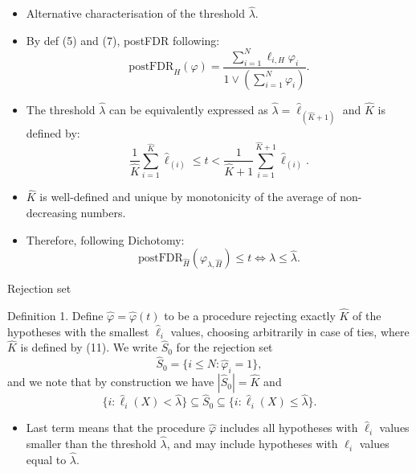 \documentclass[10pt, aspectratio=169]{beamer}
\begin{document}
\begin{frame}
    \begin{itemize}[label=\scalebox{0.5}{$\bullet$}]
        \item Alternative characterisation of the threshold \( \hat{\lambda} \).
        \item By def (5) and (7), postFDR following: 
        \begin{equation}
            \text{postFDR}_H(\varphi) = \frac{\sum_{i=1}^{N} \ell_{i,H} \varphi_i}{1 \lor (\sum_{i=1}^{N} \varphi_i)}. \tag{10}
        \end{equation}
        \item The threshold \( \hat{\lambda} \) can be equivalently expressed as \( \hat{\lambda} = \hat{\ell}_{(\hat{K}+1)} \) and \( \hat{K} \) is defined by:
        \begin{equation}
            \frac{1}{\hat{K}} \sum_{i=1}^{\hat{K}} \hat{\ell}_{(i)} \leq t < \frac{1}{\hat{K}+1} \sum_{i=1}^{\hat{K}+1} \hat{\ell}_{(i)}. \tag{11}
        \end{equation}
        \item \( \hat{K} \) is well-defined and unique by monotonicity of the average of non-decreasing numbers.
        \item Therefore, following Dichotomy:
        \begin{equation}
            \text{postFDR}_{\hat{H}}(\varphi_{\lambda, \hat{H}}) \leq t \iff \lambda \leq \hat{\lambda}. \tag{12}
        \end{equation}
    \end{itemize}
\end{frame}
\begin{frame}{Rejection set}
    \begin{mydefbox}{Definition 1.}
        Define \( \hat{\varphi} = \hat{\varphi}(t) \) to be a procedure rejecting exactly \( \hat{K} \) of the hypotheses with the smallest \( \hat{\ell}_i \) values, choosing arbitrarily in case of ties, where \( \hat{K} \) is defined by (11). We write \( \hat{S}_0 \) for the rejection set
        \[
        \hat{S}_0 = \{i \leq N : \hat{\varphi}_i = 1\},
        \]
        and we note that by construction we have \( |\hat{S}_0| = \hat{K} \) and
        \[
        \{i : \hat{\ell}_i(X) < \hat{\lambda} \} \subseteq \hat{S}_0 \subseteq \{i : \hat{\ell}_i(X) \leq \hat{\lambda} \}.
        \]
    \end{mydefbox}
    \begin{itemize}[label=\scalebox{0.5}{$\blacksquare$}]
    \item Last term means that the procedure \(\hat{\varphi}\) includes all hypotheses with \(\hat{\ell}_i\) values smaller than the threshold \(\hat{\lambda}\), and may include hypotheses with \(\hat{\ell}_i\) values equal to \(\hat{\lambda}\).
    \end{itemize}

\end{frame}
\end{document}
